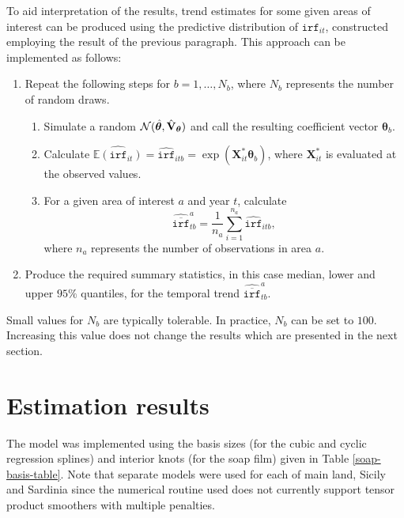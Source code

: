 To aid interpretation of the results, trend estimates for some given areas of interest can be produced using the predictive distribution of $\texttt{irf}_{it}$, constructed employing the result of the previous paragraph. This approach can be implemented as follows:

\begin{enumerate}
	\item Repeat the following steps for $b=1,\ldots,N_b$, where $N_b$ represents the number of random draws. 
	   \begin{enumerate}
	      \item Simulate a random $\mathcal{N}(\hat{\bm\theta}, \hat{{\bf V}}_{\bm\theta} )$ and call the resulting coefficient vector $\bm\theta_b$.
	      \item Calculate $\widehat{\mathbb{E}(\texttt{irf}_{it})}=\widehat{\texttt{irf}}_{itb}=\exp(\mathbf{X}^*_{it}\bm\theta_b)$, where $\mathbf{X}^*_{it}$ is evaluated at the observed values. 
	      \item For a given area of interest $a$ and year $t$, calculate
	      $$\widehat{\overline{\texttt{irf}}}_{tb}^a=\frac{1}{n_a}\sum_{i=1}^{n_a} \widehat{\texttt{irf}}_{itb},$$
	      where $n_a$ represents the number of observations in area $a$.     
	   \end{enumerate}
	\item Produce the required summary statistics, in this case median, lower and upper $95\%$ quantiles, for the temporal trend $\widehat{\overline{\texttt{irf}}}_{tb}^a$.
\end{enumerate}
Small values for $N_b$ are typically tolerable. In practice, $N_b$ can be set to $100$. Increasing this value does not change the results which are presented in the next section.
 

\section{Estimation results \label{ER}}

The model was implemented using the basis sizes (for the cubic and cyclic regression splines) and interior knots (for the soap film) given in Table \ref{soap-basis-table}. Note that separate models were used for each of main land, Sicily and Sardinia since the numerical routine used does not currently support tensor product smoothers with multiple penalties. 

